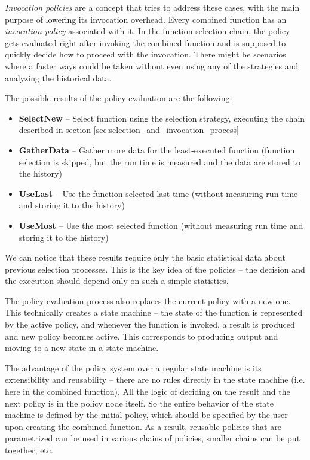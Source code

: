 \textit{Invocation policies} are a concept that tries to address these cases, with the main purpose of lowering its invocation overhead. Every combined function has an \textit{invocation policy} associated with it. In the function selection chain, the policy gets evaluated right after invoking the combined function and is supposed to quickly decide how to proceed with the invocation. There might be scenarios where a faster ways could be taken without even using any of the strategies and analyzing the historical data.

The possible results of the policy evaluation are the following:

\begin{itemize}
	\item \textbf{SelectNew} -- Select function using the selection strategy, executing the chain described in section \ref{sec:selection_and_invocation_process}
	\item \textbf{GatherData} -- Gather more data for the least-executed function (function selection is skipped, but the run time is measured and the data are stored to the history)
	\item \textbf{UseLast} -- Use the function selected last time (without measuring run time and storing it to the history)
	\item \textbf{UseMost} -- Use the most selected function (without measuring run time and storing it to the history)
\end{itemize}

We can notice that these results require only the basic statistical data about previous selection processes. This is the key idea of the policies -- the decision and the execution should depend only on such a simple statistics.

The policy evaluation process also replaces the current policy with a new one. This technically creates a state machine -- the state of the function is represented by the active policy, and whenever the function is invoked, a result is produced and new policy becomes active. This corresponds to producing output and moving to a new state in a state machine.

The advantage of the policy system over a regular state machine is its extensibility and reusability -- there are no rules directly in the state machine (i.e. here in the combined function). All the logic of deciding on the result and the next policy is in the policy node itself. So the entire behavior of the state machine is defined by the initial policy, which should be specified by the user upon creating the combined function. As a result, reusable policies that are parametrized can be used in various chains of policies, smaller chains can be put together, etc.

